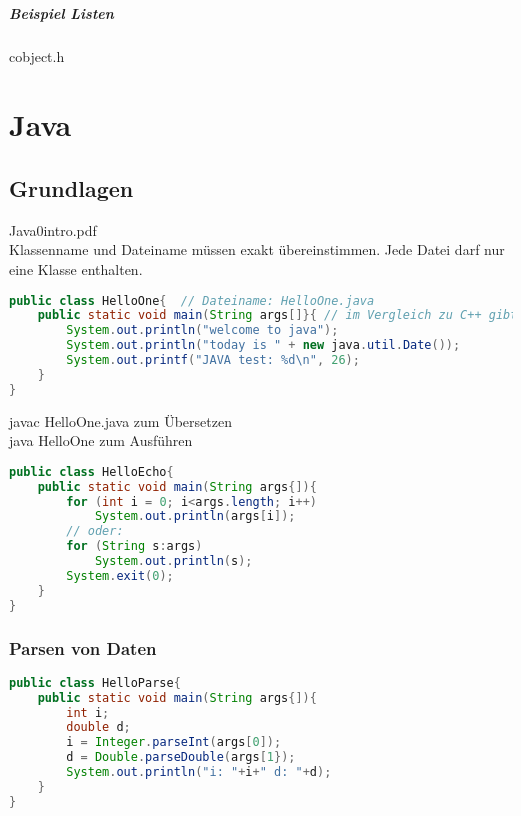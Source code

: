 \paragraph{Beispiel Listen}
cobject.h

\chapter{Java}
\section{Grundlagen}
Java0intro.pdf\\
Klassenname und Dateiname müssen exakt übereinstimmen. Jede Datei darf nur eine Klasse enthalten.
\begin{lstlisting}[language=Java]
public class HelloOne{	// Dateiname: HelloOne.java
	public static void main(String args[]}{	// im Vergleich zu C++ gibt es keinen public-Bereich, die Eigenschaft muss vor jede Funktion/Variabel geschrieben werden.
		System.out.println("welcome to java");
		System.out.println("today is " + new java.util.Date());
		System.out.printf("JAVA test: %d\n", 26);
	}
}
\end{lstlisting}
javac HelloOne.java zum Übersetzen\\
java HelloOne zum Ausführen
\begin{lstlisting}[language=Java]
public class HelloEcho{
	public static void main(String args{]){
		for (int i = 0; i<args.length; i++)
			System.out.println(args[i]);
		// oder:
		for (String s:args)
			System.out.println(s);
		System.exit(0);
	}
}
\end{lstlisting}
\subsection{Parsen von Daten}
\begin{lstlisting}[language=Java]
public class HelloParse{
	public static void main(String args{]){
		int i;
		double d;
		i = Integer.parseInt(args[0]);
		d = Double.parseDouble(args[1});
		System.out.println("i: "+i+" d: "+d);
	}
}
\end{lstlisting}
